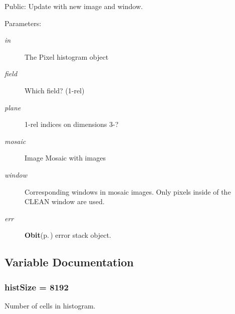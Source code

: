Public: Update with new image and window. 

\begin{Desc}
\item[Parameters:]
\begin{description}
\item[{\em in}]The Pixel histogram object \item[{\em field}]Which field? (1-rel) \item[{\em plane}]1-rel indices on dimensions 3-? \item[{\em mosaic}]Image Mosaic with images \item[{\em window}]Corresponding windows in mosaic images. Only pixels inside of the CLEAN window are used. \item[{\em err}]{\bf Obit}{\rm (p.\,\pageref{structObit})} error stack object. \end{description}
\end{Desc}


\subsection{Variable Documentation}
\subsubsection{ {\bf hist\-Size} = 8192}\label{ObitDConCleanPxHist_8c_a3}


Number of cells in histogram. 

